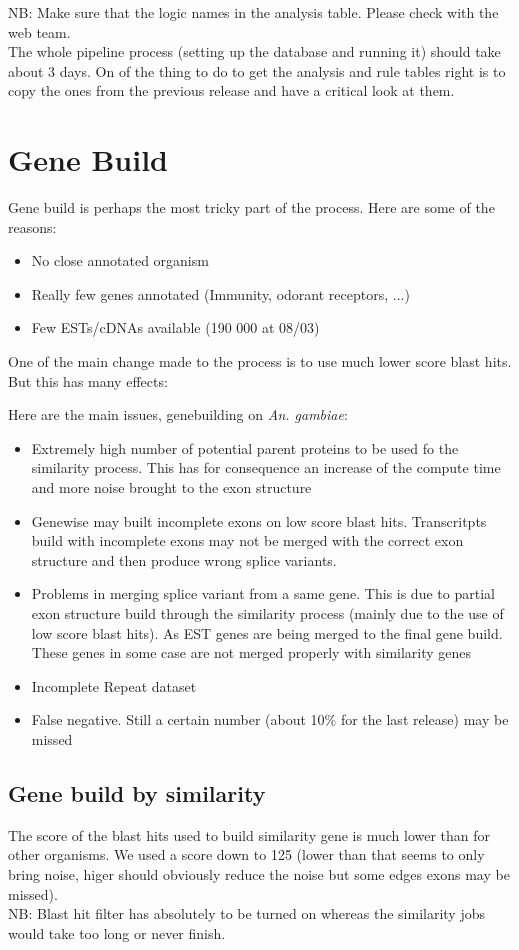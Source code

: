 \documentclass[a4paper,10pt]{article}
\begin{document}
NB: Make sure that the logic names in the analysis table. Please check with the web team.\\
The whole pipeline process (setting up the database and running it) should take about 3 days. On of the thing to do to get the analysis and rule tables right is to copy the ones from the previous release and have a critical look at them.

\section{Gene Build}
Gene build is perhaps the most tricky part of the process. Here are some of the reasons:
\begin{itemize}
\item No close annotated organism
\item Really few genes annotated (Immunity, odorant receptors, ...)
\item Few ESTs/cDNAs available (190 000 at 08/03)
\end{itemize}
One of the main change made to the process is to use much lower score blast hits. But this has many effects:

Here are the main issues, genebuilding on \textit{An. gambiae}:
\begin{itemize}
\item Extremely high number of potential parent proteins to be used fo the similarity process. This has for consequence an increase of the compute time and more noise brought to the exon structure
\item Genewise may built incomplete exons on low score blast hits. Transcritpts build with incomplete exons may not be merged with the correct exon structure and then produce wrong splice variants.
\item Problems in merging splice variant from a same gene. This is due to partial exon structure build through the similarity process (mainly due to the use of low score blast hits). As EST genes are being merged to the final gene build. These genes in some case are not merged properly with similarity genes
\item Incomplete Repeat dataset
\item False negative. Still a certain number (about 10\% for the last release) may be missed
\end{itemize}

\subsection{Gene build by similarity}
The score of the blast hits used to build similarity gene is much lower than for other organisms. We used a score down to 125 (lower than that seems to only bring noise, higer should obviously reduce the noise but some edges exons may be missed).
\\
NB: Blast hit filter has absolutely to be turned on whereas the similarity jobs would take too long or never finish.
\end{document}
